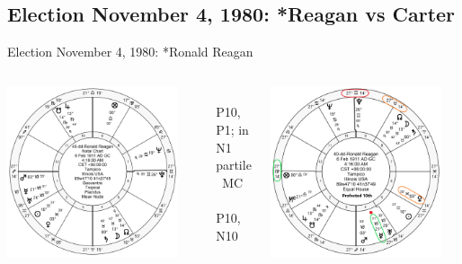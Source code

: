 \subsection{Election November 4, 1980: *Reagan vs Carter}
\begin{frame}[t]{Election November 4, 1980: *Ronald Reagan}
\small

\begin{columns}[T, onlytextwidth]
\vspace{-1em}
{\includegraphics[width=0.9\textwidth]{charts/Reagan-dd.png}}
\fontsize{8pt}{9pt}\selectfont

\Mercury\, \Opposition\, P10, \Square\, P1; in N1 partile \Square\, MC \\
\Venus\, \Trine\, P10, \Trine\, N10

\vspace{-1em}
{\includegraphics[width=0.9\textwidth]{charts/Reagan-dd-Prof-10th.png}}
\fontsize{8pt}{9pt}\selectfont


\end{columns}
\end{frame}

